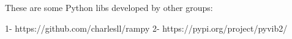 These are some Python libs developed by other groups:

1- https://github.com/charlesll/rampy
2- https://pypi.org/project/pyvib2/
